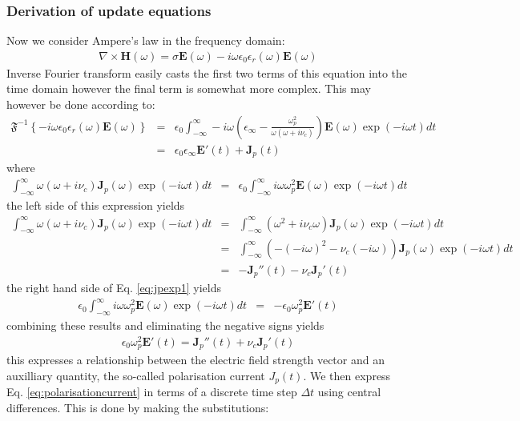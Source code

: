 \documentclass[a4paper, 12pt]{article}
\begin{document}
	\subsubsection{Derivation of update equations}
	Now we consider Ampere's law in the frequency domain:
	\begin{eqnarray}
		\nabla\times\boldsymbol{H}(\omega)=\sigma\boldsymbol{E}(\omega)-i\omega\epsilon_0\epsilon_r(\omega)\boldsymbol{E}(\omega)\label{eq:ampere}
	\end{eqnarray}
	Inverse Fourier transform easily casts the first two terms of this
	equation into the time domain however the final term is somewhat more
	complex. This may however be done according to:
	\begin{eqnarray}
		\mathfrak{F}^{-1}\left\{-i\omega\epsilon_0\epsilon_r(\omega)\boldsymbol{E}(\omega)\right\}&=&
		\epsilon_0\int_{-\infty}^{\infty}-i\omega\left(\epsilon_\infty -
		\frac{\omega_p^2}{\omega\left(\omega+i\nu_c\right)}\right)\boldsymbol{E}(\omega)\exp(-i\omega
		t)dt\\
		&=&\epsilon_0\epsilon_\infty\boldsymbol{E}'(t)+\boldsymbol{J}_p(t)
	\end{eqnarray}
	where
	\begin{eqnarray}
		\int_{-\infty}^{\infty}\omega\left(\omega+i\nu_c\right)\boldsymbol{J}_p(\omega)\exp(-i\omega t)dt&=&\epsilon_0\int_{-\infty}^{\infty}i\omega\omega_p^2\boldsymbol{E}(\omega)\exp(-i\omega
		t)dt\label{eq:jpexp1}
	\end{eqnarray}
	the left side of this expression yields
	\begin{eqnarray}
		\int_{-\infty}^{\infty}\omega\left(\omega+i\nu_c\right)\boldsymbol{J}_p(\omega)\exp(-i\omega
		t)dt&=&\int_{-\infty}^{\infty}\left(\omega^2+i\nu_c\omega\right)\boldsymbol{J}_p(\omega)\exp(-i\omega
		t)dt\\
		&=&\int_{-\infty}^{\infty}\left( -(-i\omega)^2 -\nu_c(-i\omega)\right)\boldsymbol{J}_p(\omega)\exp(-i\omega
		t)dt\\
		&=&-\boldsymbol{J}_p''(t) - \nu_c\boldsymbol{J}_p'(t)
	\end{eqnarray}
	the right hand side of Eq. \ref{eq:jpexp1} yields
	\begin{eqnarray}
		\epsilon_0\int_{-\infty}^{\infty}i\omega\omega_p^2\boldsymbol{E}(\omega)\exp(-i\omega
		t)dt&=&-\epsilon_0\omega_p^2\boldsymbol{E}'(t)
	\end{eqnarray}
	combining these results and eliminating the negative signs  yields
	\begin{eqnarray}
		\epsilon_0\omega_p^2\boldsymbol{E}'(t)=\boldsymbol{J}_p''(t) + \nu_c\boldsymbol{J}_p'(t)\label{eq:polarisationcurrent}
	\end{eqnarray}
	this expresses a relationship between the electric field strength
	vector and an auxilliary quantity, the so-called polarisation current
	${J}_p(t)$. We then express Eq. \ref{eq:polarisationcurrent} in terms
	of a discrete time step $\Delta t$ using central differences. This is
	done by making the substitutions:
\end{document}
